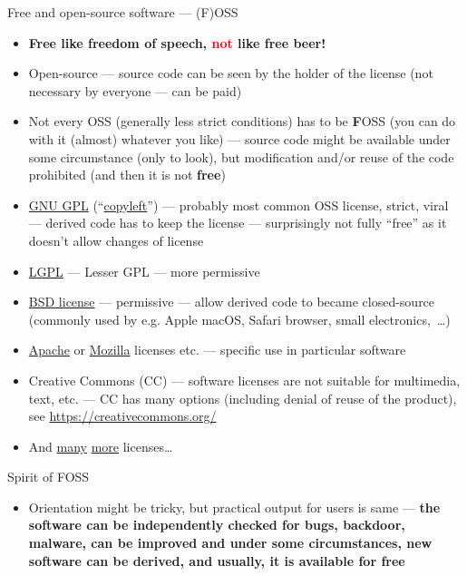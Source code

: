 \documentclass[compress, xelatex, 11pt, xcolor=svgnames, aspectratio=169, url={hyphens, lowtilde}]{beamer}
\renewcommand{\alert}[1]{\textcolor{red}{#1}}
\begin{document}
\begin{frame}[allowframebreaks]{Free and open-source software --- (F)OSS}
	\begin{itemize}
		\item \textbf{Free like freedom of speech, \alert{not} like free beer!}
		\item Open-source --- source code can be seen by the holder of the license (not necessary by everyone --- can be paid)
		\item Not every OSS (generally less strict conditions) has to be \textbf{F}OSS (you can do with it (almost) whatever you like) --- source code might be available under some circumstance (only to look), but modification and/or reuse of the code prohibited (and then it is not \textbf{free})
		\item \href{https://www.gnu.org/licenses/gpl-3.0.html}{GNU GPL} (\enquote{\href{https://www.gnu.org/copyleft/}{copyleft}}) --- probably most common OSS license, strict, viral --- derived code has to keep the license --- surprisingly not fully \enquote{free} as it doesn't allow changes of license
		\item \href{https://www.gnu.org/licenses/lgpl-3.0.en.html}{LGPL} --- Lesser GPL --- more permissive
		\item \href{https://en.wikipedia.org/wiki/BSD_licenses}{BSD license} --- permissive --- allow derived code to became closed-source (commonly used by e.g. Apple macOS, Safari browser, small electronics,~\ldots)
		\item \href{https://www.apache.org/licenses/}{Apache} or \href{https://www.mozilla.org/MPL/}{Mozilla} licenses etc. --- specific use in particular software
		\item Creative Commons (CC) --- software licenses are not suitable for multimedia, text, etc. --- CC has many options (including denial of reuse of the product), see \url{https://creativecommons.org/}
		\item And \href{https://en.wikipedia.org/wiki/Comparison_of_free_and_open-source_software_licenses}{many} \href{https://opensource.org/licenses}{more} licenses\ldots
	\end{itemize}
	\begin{block}{Spirit of FOSS}
		\begin{itemize}
			\item Orientation might be tricky, but practical output for users is same --- \textbf{the software can be independently checked for bugs, backdoor, malware, can be improved and under some circumstances, new software can be derived, and usually, it is available for free}

\end{itemize}
\end{block}
\end{frame}
\end{document}
